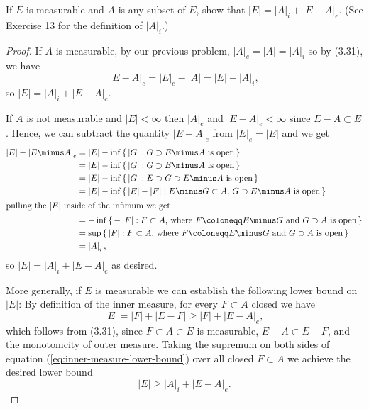 \begin{problem}
If $E$ is measurable and $A$ is any subset of $E$, show that
$\left|E\right|=\left|A\right|_i+\left|E\minus A\right|_e$. (See Exercise 13 for
the definition of $\left|A\right|_i$.)
\end{problem}
\begin{proof}
If $A$ is measurable, by our previous problem,
$\left|A\right|_e=\left|A\right|=\left|A\right|_i$ so by (3.31), we have
\[
|E\minus A|_e=|E|_e-|A|=|E|-|A|_i,
\]
so $\left|E\right|=\left|A\right|_i+\left|E\minus A\right|_e$.

If $A$ is not measurable and $\left|E\right|<\infty$ then $|A|_e$ and
$\left|E\minus A\right|_e<\infty$ since $E\minus A\subset E$. Hence, we can
subtract the quantity $\left|E\minus A\right|_e$ from
$\left|E\right|_e=\left|E\right|$ and we get
\begin{align*}
\left|E\right|-\left|E\minus A\right|_e
&=\left|E\right|-\inf\left\{\,\left|G\right|:\text{$G\supset E\minus A$ is open}\,\right\}\\
&=\left|E\right|-\inf\left\{\,\left|G\right|:\text{$G\supset E\minus A$ is open}\,\right\}\\
&=\left|E\right|-\inf\left\{\,\left|G\right|:\text{$E\supset G\supset E\minus
  A$ is open}\,\right\}\\
&=\left|E\right|-\inf\left\{\,\left|E\right|-\left|F\right|:\text{$E\minus
  G\subset A$, $G\supset E\minus A$ is open}\,\right\}\\
\intertext{pulling the $|E|$ inside of the infimum we get}
&=-\inf\left\{\,-\left|F\right|:\text{$F\subset A$, where $F\coloneqq
  E\minus G$ and $G\supset A$ is open}\,\right\}\\
&=\sup\left\{\,\left|F\right|:\text{$F\subset A$, where $F\coloneqq
  E\minus G$ and $G\supset A$ is open}\,\right\}\\
&=\left|A\right|_i,
\end{align*}
so $\left|E\right|=\left|A\right|_i+\left|E\minus A\right|_e$ as desired.

More generally, if $E$ is measurable we can establish the following lower
bound on $|E|$: By definition of the inner measure, for every $F\subset A$
closed we have
\begin{equation}
\label{eq:inner-measure-lower-bound}
|E|=|F|+|E\minus F|\geq |F|+\left|E\minus A\right|_e,
\end{equation}
which follows from (3.31), since $F\subset A\subset E$ is measurable,
$E\minus A\subset E\minus F$, and the monotonicity of outer measure. Taking
the supremum on both sides of equation (\ref{eq:inner-measure-lower-bound})
over all closed $F\subset A$ we achieve the desired lower bound
\begin{equation}
  \label{eq:lower-bound}
|E|\geq |A|_i+|E\minus A|_e.
\end{equation}


\end{proof}
